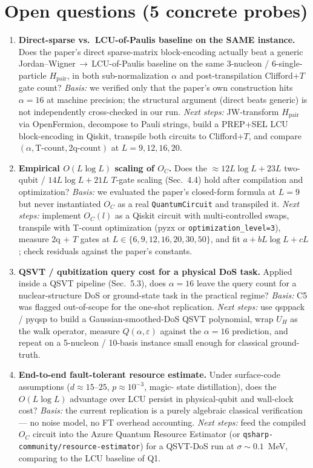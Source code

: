 \section{Open questions (5 concrete probes)}

\begin{enumerate}
\item \textbf{Direct-sparse vs.\ LCU-of-Paulis baseline on the SAME instance.}
Does the paper's direct sparse-matrix block-encoding actually beat a generic
Jordan--Wigner\,$\to$\,LCU-of-Paulis baseline on the same 3-nucleon /
6-single-particle $H_{\text{pair}}$, in both sub-normalization $\alpha$ and
post-transpilation Clifford+$T$ gate count?
\emph{Basis:} we verified only that the paper's own construction hits
$\alpha=16$ at machine precision; the structural argument (direct beats
generic) is not independently cross-checked in our run.
\emph{Next steps:} JW-transform $H_{\text{pair}}$ via OpenFermion, decompose to
Pauli strings, build a PREP+SEL LCU block-encoding in Qiskit, transpile both
circuits to Clifford+$T$, and compare
$(\alpha,\text{T-count},\text{2q-count})$ at $L{=}9,12,16,20$.

\item \textbf{Empirical $O(L\log L)$ scaling of $O_C$.}
Does the $\approx 12L\log L + 23L$ two-qubit / $14L\log L + 21L$ $T$-gate
scaling (Sec.~4.4) hold after compilation and optimization?
\emph{Basis:} we evaluated the paper's closed-form formula at $L{=}9$ but never
instantiated $O_C$ as a real \texttt{QuantumCircuit} and transpiled it.
\emph{Next steps:} implement $O_C(l)$ as a Qiskit circuit with multi-controlled
swaps, transpile with T-count optimization (pyzx or
\texttt{optimization\_level=3}), measure 2q + $T$ gates at
$L\in\{6,9,12,16,20,30,50\}$, and fit $a + bL\log L + cL$; check residuals
against the paper's constants.

\item \textbf{QSVT / qubitization query cost for a physical DoS task.}
Applied inside a QSVT pipeline (Sec.~5.3), does $\alpha=16$ leave the query
count for a nuclear-structure DoS or ground-state task in the practical
regime?
\emph{Basis:} C5 was flagged out-of-scope for the one-shot replication.
\emph{Next steps:} use qsppack / pyqsp to build a Gaussian-smoothed-DoS QSVT
polynomial, wrap $U_H$ as the walk operator, measure $Q(\alpha,\varepsilon)$
against the $\alpha=16$ prediction, and repeat on a 5-nucleon / 10-basis
instance small enough for classical ground-truth.

\item \textbf{End-to-end fault-tolerant resource estimate.}
Under surface-code assumptions ($d\approx 15$--$25$, $p\approx 10^{-3}$, magic-
state distillation), does the $O(L\log L)$ advantage over LCU persist in
physical-qubit and wall-clock cost?
\emph{Basis:} the current replication is a purely algebraic classical
verification --- no noise model, no FT overhead accounting.
\emph{Next steps:} feed the compiled $O_C$ circuit into the Azure Quantum
Resource Estimator (or \texttt{qsharp-community/resource-estimator}) for a
QSVT-DoS run at $\sigma \sim 0.1$~MeV, comparing to the LCU baseline of Q1.


\end{enumerate}
